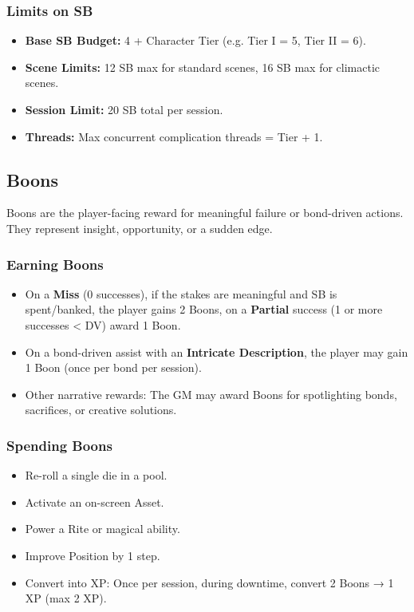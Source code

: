 \subsubsection{Limits on SB}
\begin{itemize}
  \item \textbf{Base SB Budget:} 4 + Character Tier (e.g. Tier I = 5, Tier II = 6).
  \item \textbf{Scene Limits:} 12 SB max for standard scenes, 16 SB max for climactic scenes.
  \item \textbf{Session Limit:} 20 SB total per session.
  \item \textbf{Threads:} Max concurrent complication threads = Tier + 1.
\end{itemize}

\subsection{Boons}
Boons are the player-facing reward for meaningful failure or bond-driven actions. They represent insight, opportunity, or a sudden edge.

\subsubsection{Earning Boons}
\begin{itemize}
	\item On a \textbf{Miss} (0 successes), if the stakes are meaningful and SB is spent/banked, the player gains 2 Boons, on a \textbf{Partial} success (1 or more successes < DV) award 1 Boon.
  \item On a bond-driven assist with an \textbf{Intricate Description}, the player may gain 1 Boon (once per bond per session).
  \item Other narrative rewards: The GM may award Boons for spotlighting bonds, sacrifices, or creative solutions.
\end{itemize}

\subsubsection{Spending Boons}
\begin{itemize}
  \item Re-roll a single die in a pool.
  \item Activate an on-screen Asset.
  \item Power a Rite or magical ability.
  \item Improve Position by 1 step.
  \item Convert into XP: Once per session, during downtime, convert 2 Boons → 1 XP (max 2 XP).
\end{itemize}

